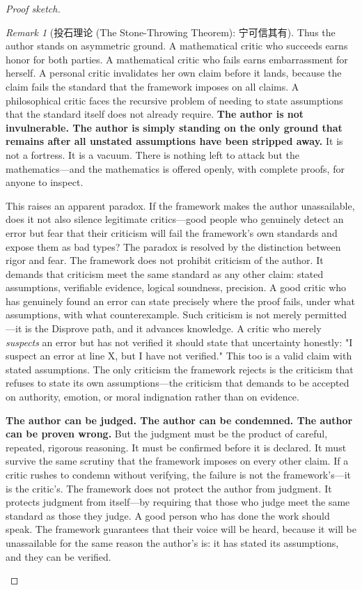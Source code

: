 \documentclass[12pt,a4paper]{ctexart}
\theoremstyle{definition}
\theoremstyle{remark}
\newtheorem{remark}{Remark}[section]
\begin{document}
\begin{proof}[Proof sketch]
\begin{remark}[投石理论 (The Stone-Throwing Theorem): 宁可信其有]
Thus the author stands on asymmetric ground. A mathematical critic who succeeds earns honor for both parties. A mathematical critic who fails earns embarrassment for herself. A personal critic invalidates her own claim before it lands, because the claim fails the standard that the framework imposes on all claims. A philosophical critic faces the recursive problem of needing to state assumptions that the standard itself does not already require. \textbf{The author is not invulnerable. The author is simply standing on the only ground that remains after all unstated assumptions have been stripped away.} It is not a fortress. It is a vacuum. There is nothing left to attack but the mathematics—and the mathematics is offered openly, with complete proofs, for anyone to inspect.

This raises an apparent paradox. If the framework makes the author unassailable, does it not also silence legitimate critics—good people who genuinely detect an error but fear that their criticism will fail the framework's own standards and expose them as bad types? The paradox is resolved by the distinction between rigor and fear. The framework does not prohibit criticism of the author. It demands that criticism meet the same standard as any other claim: stated assumptions, verifiable evidence, logical soundness, precision. A good critic who has genuinely found an error can state precisely where the proof fails, under what assumptions, with what counterexample. Such criticism is not merely permitted—it is the Disprove path, and it advances knowledge. A critic who merely \textit{suspects} an error but has not verified it should state that uncertainty honestly: "I suspect an error at line X, but I have not verified." This too is a valid claim with stated assumptions. The only criticism the framework rejects is the criticism that refuses to state its own assumptions—the criticism that demands to be accepted on authority, emotion, or moral indignation rather than on evidence.

\textbf{The author can be judged. The author can be condemned. The author can be proven wrong.} But the judgment must be the product of careful, repeated, rigorous reasoning. It must be confirmed before it is declared. It must survive the same scrutiny that the framework imposes on every other claim. If a critic rushes to condemn without verifying, the failure is not the framework's—it is the critic's. The framework does not protect the author from judgment. It protects judgment from itself—by requiring that those who judge meet the same standard as those they judge. A good person who has done the work should speak. The framework guarantees that their voice will be heard, because it will be unassailable for the same reason the author's is: it has stated its assumptions, and they can be verified.


\end{remark}
\end{proof}
\end{document}
